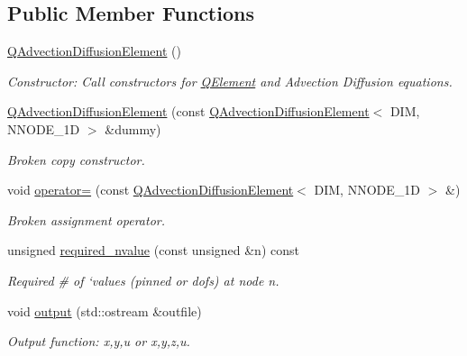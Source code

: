 \subsection*{Public Member Functions}
\begin{DoxyCompactItemize}
\item 
\hyperlink{classoomph_1_1QAdvectionDiffusionElement_a2b1a0c14ece711eee8af18864147e884}{Q\+Advection\+Diffusion\+Element} ()
\begin{DoxyCompactList}\small\item\em Constructor\+: Call constructors for \hyperlink{classoomph_1_1QElement}{Q\+Element} and Advection Diffusion equations. \end{DoxyCompactList}\item 
\hyperlink{classoomph_1_1QAdvectionDiffusionElement_a666a536d74e1fdb9bd48f70b2f708e20}{Q\+Advection\+Diffusion\+Element} (const \hyperlink{classoomph_1_1QAdvectionDiffusionElement}{Q\+Advection\+Diffusion\+Element}$<$ D\+IM, N\+N\+O\+D\+E\+\_\+1D $>$ \&dummy)
\begin{DoxyCompactList}\small\item\em Broken copy constructor. \end{DoxyCompactList}\item 
void \hyperlink{classoomph_1_1QAdvectionDiffusionElement_a3ae936af68a9db003914b4da44985e9c}{operator=} (const \hyperlink{classoomph_1_1QAdvectionDiffusionElement}{Q\+Advection\+Diffusion\+Element}$<$ D\+IM, N\+N\+O\+D\+E\+\_\+1D $>$ \&)
\begin{DoxyCompactList}\small\item\em Broken assignment operator. \end{DoxyCompactList}\item 
unsigned \hyperlink{classoomph_1_1QAdvectionDiffusionElement_a5add10bf35486c4ece4505a067cc2fd2}{required\+\_\+nvalue} (const unsigned \&n) const
\begin{DoxyCompactList}\small\item\em Required \# of `values\textquotesingle{} (pinned or dofs) at node n. \end{DoxyCompactList}\item 
void \hyperlink{classoomph_1_1QAdvectionDiffusionElement_af30152cc8ea671b103239fc6b3e506ce}{output} (std\+::ostream \&outfile)
\begin{DoxyCompactList}\small\item\em Output function\+: x,y,u or x,y,z,u. \end{DoxyCompactList}\item 

\end{DoxyCompactItemize}
